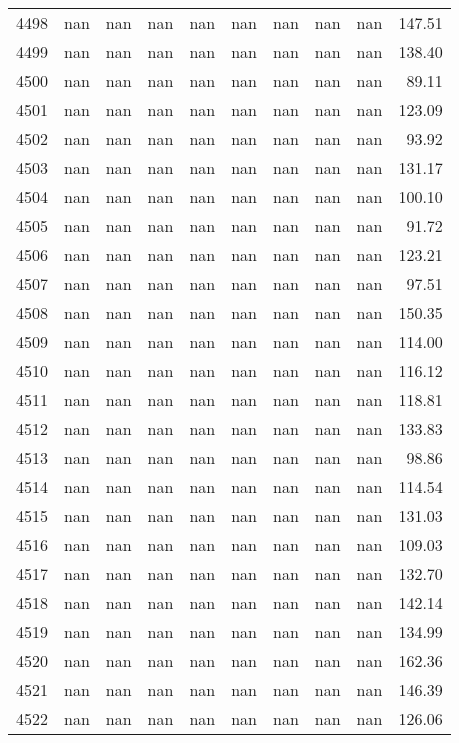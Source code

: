 \begin{tabular}{lrrrrrrrrr}
4498 & nan & nan & nan & nan & nan & nan & nan & nan & 147.51 \\
4499 & nan & nan & nan & nan & nan & nan & nan & nan & 138.40 \\
4500 & nan & nan & nan & nan & nan & nan & nan & nan & 89.11 \\
4501 & nan & nan & nan & nan & nan & nan & nan & nan & 123.09 \\
4502 & nan & nan & nan & nan & nan & nan & nan & nan & 93.92 \\
4503 & nan & nan & nan & nan & nan & nan & nan & nan & 131.17 \\
4504 & nan & nan & nan & nan & nan & nan & nan & nan & 100.10 \\
4505 & nan & nan & nan & nan & nan & nan & nan & nan & 91.72 \\
4506 & nan & nan & nan & nan & nan & nan & nan & nan & 123.21 \\
4507 & nan & nan & nan & nan & nan & nan & nan & nan & 97.51 \\
4508 & nan & nan & nan & nan & nan & nan & nan & nan & 150.35 \\
4509 & nan & nan & nan & nan & nan & nan & nan & nan & 114.00 \\
4510 & nan & nan & nan & nan & nan & nan & nan & nan & 116.12 \\
4511 & nan & nan & nan & nan & nan & nan & nan & nan & 118.81 \\
4512 & nan & nan & nan & nan & nan & nan & nan & nan & 133.83 \\
4513 & nan & nan & nan & nan & nan & nan & nan & nan & 98.86 \\
4514 & nan & nan & nan & nan & nan & nan & nan & nan & 114.54 \\
4515 & nan & nan & nan & nan & nan & nan & nan & nan & 131.03 \\
4516 & nan & nan & nan & nan & nan & nan & nan & nan & 109.03 \\
4517 & nan & nan & nan & nan & nan & nan & nan & nan & 132.70 \\
4518 & nan & nan & nan & nan & nan & nan & nan & nan & 142.14 \\
4519 & nan & nan & nan & nan & nan & nan & nan & nan & 134.99 \\
4520 & nan & nan & nan & nan & nan & nan & nan & nan & 162.36 \\
4521 & nan & nan & nan & nan & nan & nan & nan & nan & 146.39 \\
4522 & nan & nan & nan & nan & nan & nan & nan & nan & 126.06 \\

\end{tabular}

